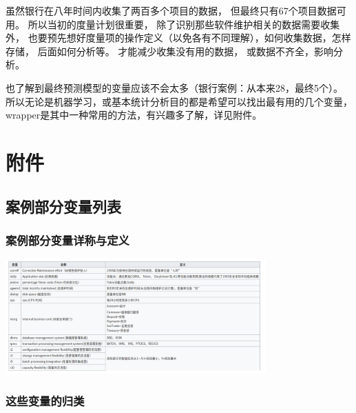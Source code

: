 虽然银行在八年时间内收集了两百多个项目的数据，
但最终只有67个项目数据可用。 所以当初的度量计划很重要，
除了识别那些软件维护相关的数据需要收集外，
也要预先想好度量项的操作定义（以免各有不同理解），如何收集数据，怎样存储，
后面如何分析等。 才能减少收集没有用的数据， 或数据不齐全，影响分析。

也了解到最终预测模型的变量应该不会太多（银行案例：从本来28，最终5个）。
所以无论是机器学习，或基本统计分析目的都是希望可以找出最有用的几个变量，wrapper是其中一种常用的方法，有兴趣多了解，详见附件。

\hypertarget{ux9644ux4ef6}{%
\section{附件}\label{ux9644ux4ef6}}

\hypertarget{ux6848ux4f8bux90e8ux5206ux53d8ux91cfux5217ux8868}{%
\subsection{案例部分变量列表}\label{ux6848ux4f8bux90e8ux5206ux53d8ux91cfux5217ux8868}}

\hypertarget{ux6848ux4f8bux90e8ux5206ux53d8ux91cfux8be6ux79f0ux4e0eux5b9aux4e49}{%
\subsubsection{案例部分变量详称与定义}\label{ux6848ux4f8bux90e8ux5206ux53d8ux91cfux8be6ux79f0ux4e0eux5b9aux4e49}}


\includegraphics[width=10cm]{Screenshotfrom2023-01-0420-19-59.png}

\hypertarget{ux8fd9ux4e9bux53d8ux91cfux7684ux5f52ux7c7b}{%
\subsubsection{这些变量的归类}\label{ux8fd9ux4e9bux53d8ux91cfux7684ux5f52ux7c7b}}


